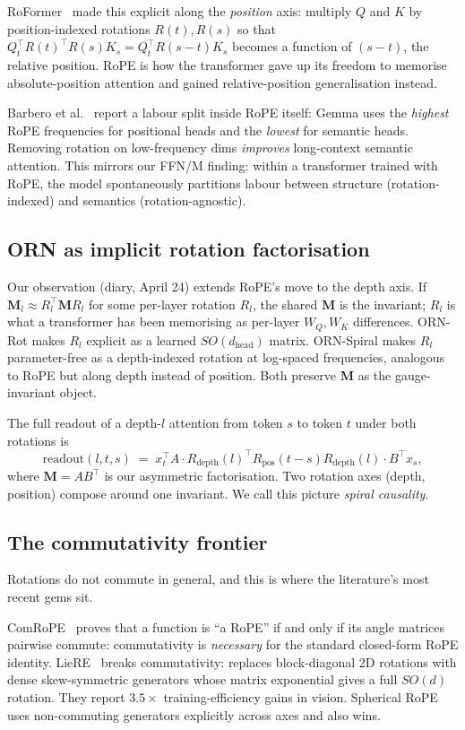 \documentclass[10pt, twocolumn, a4paper]{article}
\newcommand{\M}{\mathbf{M}}
\begin{document}
RoFormer~\cite{su2021roformer} made this explicit along the \emph{position} axis: multiply $Q$ and $K$ by position-indexed rotations $R(t), R(s)$ so that $Q_t^\top R(t)^\top R(s) K_s = Q_t^\top R(s-t) K_s$ becomes a function of $(s-t)$, the relative position. RoPE is how the transformer gave up its freedom to memorise absolute-position attention and gained relative-position generalisation instead.

Barbero et al.~\cite{barbero2025round} report a labour split inside RoPE itself: Gemma uses the \emph{highest} RoPE frequencies for positional heads and the \emph{lowest} for semantic heads. Removing rotation on low-frequency dims \emph{improves} long-context semantic attention. This mirrors our FFN/M finding: within a transformer trained with RoPE, the model spontaneously partitions labour between structure (rotation-indexed) and semantics (rotation-agnostic).

\subsection{ORN as implicit rotation factorisation}

Our observation (diary, April 24) extends RoPE's move to the depth axis. If $\M_l \approx R_l^\top \M R_l$ for some per-layer rotation $R_l$, the shared $\M$ is the invariant; $R_l$ is what a transformer has been memorising as per-layer $W_Q, W_K$ differences. ORN-Rot makes $R_l$ explicit as a learned $SO(d_{\text{head}})$ matrix. ORN-Spiral makes $R_l$ parameter-free as a depth-indexed rotation at log-spaced frequencies, analogous to RoPE but along depth instead of position. Both preserve $\M$ as the gauge-invariant object.

The full readout of a depth-$l$ attention from token $s$ to token $t$ under both rotations is
\[
\text{readout}(l, t, s) \;=\; x_t^\top A \cdot R_{\text{depth}}(l)^\top R_{\text{pos}}(t-s) R_{\text{depth}}(l) \cdot B^\top x_s,
\]
where $\M = A B^\top$ is our asymmetric factorisation. Two rotation axes (depth, position) compose around one invariant. We call this picture \emph{spiral causality}.

\subsection{The commutativity frontier}

Rotations do not commute in general, and this is where the literature's most recent gems sit.

ComRoPE~\cite{yu2025comrope} proves that a function is ``a RoPE'' if and only if its angle matrices pairwise commute: commutativity is \emph{necessary} for the standard closed-form RoPE identity. LieRE~\cite{ostmeier2024liere} breaks commutativity: replaces block-diagonal 2D rotations with dense skew-symmetric generators whose matrix exponential gives a full $SO(d)$ rotation. They report $3.5\times$ training-efficiency gains in vision. Spherical RoPE~\cite{spherical2025} uses non-commuting generators explicitly across axes and also wins.
\end{document}
